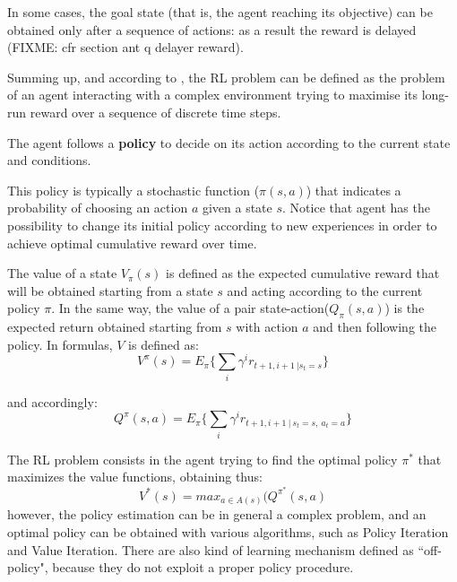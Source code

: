 In some cases, the goal state (that is, the agent reaching its objective) can be obtained only after a sequence of actions: as a result the reward is delayed (FIXME: cfr section ant q delayer reward). 

Summing up, and according to \cite{diciotto}, the  RL  problem  can  be  defined  as  the  problem  of  an agent  interacting  with  a  complex environment trying to maximise its long-run reward over a sequence of discrete time steps.

The agent follows a \textbf{policy} to decide on its action according to the current state and conditions. 

This policy is typically a  stochastic  function ($\pi(s,a)$) that  indicates a probability  of  choosing an action $a$ given a state $s$.
Notice that agent has the possibility to change its initial policy  according  to  new experiences  in order to  achieve  optimal cumulative  reward  over  time.  

The  value  of  a  state $V_\pi(s)$  is  defined  as  the  expected  cumulative reward that  will  be  obtained starting from a state $s$ and acting according to the current policy $\pi$. 
In the same way, the value of  a pair state-action($Q_\pi(s,a)$) is  the  expected  return  obtained starting  from  $s$  with  action $a$  and  then following  the policy. 
In formulas, $V$ is defined as:
\begin{equation}
V^\pi(s)=E_\pi \{ \sum_i \gamma^i r_{t+1, i+1 ~ | s_t=s } \}
\end{equation}

and accordingly:
\begin{equation}
Q^\pi(s,a)=E_\pi \{ \sum_i \gamma^i r_{t+1, i+1 ~|~ s_t=s,~ a_t=a } \}
\end{equation}

The RL problem consists in the agent trying to find the optimal policy $\pi^*$ that maximizes the value  functions, obtaining thus:
\begin{equation}
V^*(s)= max_{a \in A(s)}(Q^{\pi^*}(s,a)
\end{equation} 
however, the policy estimation can be in general a complex problem, and an optimal policy can be obtained with various algorithms, such as Policy Iteration and Value Iteration. There are also kind of learning mechanism defined as ``off-policy", because they do not exploit a proper policy procedure.

